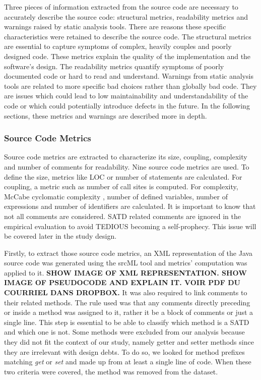 Three pieces of information extracted from the source code are necessary to accurately describe the source code: structural metrics, readability metrics and warnings raised by static analysis tools. There are reasons these specific characteristics were retained to describe the source code. The structural metrics are essential to capture symptoms of complex, heavily couples and poorly designed code. These metrics explain the quality of the implementation and the software's design. The readability metrics quantify symptoms of poorly documented code or hard to read and understand. Warnings from static analysis tools are related to more specific bad choices rather than globally bad code. They are issues which could lead to low maintainability and understandability of the code or which could potentially introduce defects in the future. In the following sections, these metrics and warnings are described more in depth.

\subsubsection{Source Code Metrics}

Source code metrics are extracted to characterize its size, coupling, complexity and number of comments for readability. Nine source code metrics are used. To define the size, metrics like \ac{LOC} or number of statements are calculated. For coupling, a metric such as number of call sites is computed. For complexity, McCabe cyclomatic complexity \citep{mccabe1990reverse}, number of defined variables, number of expressions and number of identifiers are calculated. It is important to know that not all comments are considered. \ac{SATD} related comments are ignored in the empirical evaluation to avoid \ac{TEDIOUS} becoming a self-prophecy. This issue will be covered later in the study design. \par

Firstly, to extract those source code metrics, an XML representation of the Java source code was generated using the srcML tool \citep{CollardKM03} and metrics' computation was applied to it. \textbf{SHOW IMAGE OF XML REPRESENTATION. SHOW IMAGE OF PSEUDOCODE AND EXPLAIN IT. VOIR PDF DU COURRIEL DANS DROPBOX.} It was also required to link comments to their related methods. The rule used was that any comments directly preceding or inside a method was assigned to it, rather it be a block of comments or just a single line. This step is essential to be able to classify which method is a \ac{SATD} and which one is not. Some methods were excluded from our analysis because they did not fit the context of our study, namely getter and setter methods since they are irrelevant with design debts. To do so, we looked for method prefixes matching \emph{get} or \emph{set} and made up from at least a single line of code. When these two criteria were covered, the method was removed from the dataset. \par 

